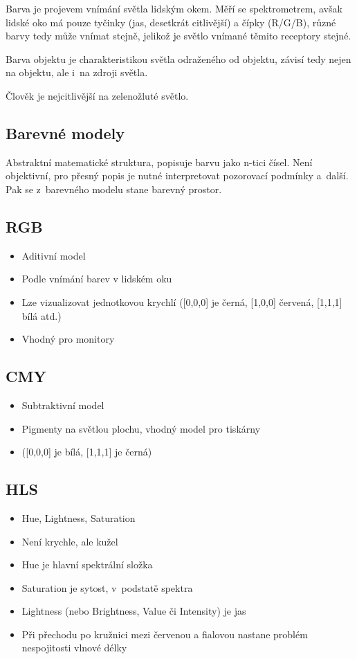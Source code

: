Barva je projevem vnímání světla lidským okem. Měří se spektrometrem, avšak lidské oko má pouze tyčinky (jas, desetkrát citlivější) a čípky (R/G/B), různé barvy tedy může vnímat stejně, jelikož je světlo vnímané těmito receptory stejné.

Barva objektu je charakteristikou světla odraženého od objektu, závisí tedy nejen na objektu, ale i~na zdroji světla.

Člověk je nejcitlivější na zelenožluté světlo.

\subsection{Barevné modely}
Abstraktní matematické struktura, popisuje barvu jako n-tici čísel. Není objektivní, pro přesný popis je nutné interpretovat pozorovací podmínky a~další. Pak se z~barevného modelu stane barevný prostor.

\subsection{RGB}
\begin{itemize}
    \item Aditivní model
    \item Podle vnímání barev v lidském oku
    \item Lze vizualizovat jednotkovou krychlí ([0,0,0] je černá, [1,0,0] červená, [1,1,1] bílá atd.)
    \item Vhodný pro monitory
\end{itemize}

\subsection{CMY}
\begin{itemize}
    \item Subtraktivní model
    \item Pigmenty na světlou plochu, vhodný model pro tiskárny
    \item ([0,0,0] je bílá, [1,1,1] je černá)
\end{itemize}

\subsection{HLS}
\begin{itemize}
    \item Hue, Lightness, Saturation
    \item Není krychle, ale kužel
    \item Hue je hlavní spektrální složka
    \item Saturation je sytost, v~podstatě  spektra
    \item Lightness (nebo Brightness, Value či Intensity) je jas
    \item Při přechodu po kružnici mezi červenou a fialovou nastane problém nespojitosti vlnové délky
\end{itemize}

